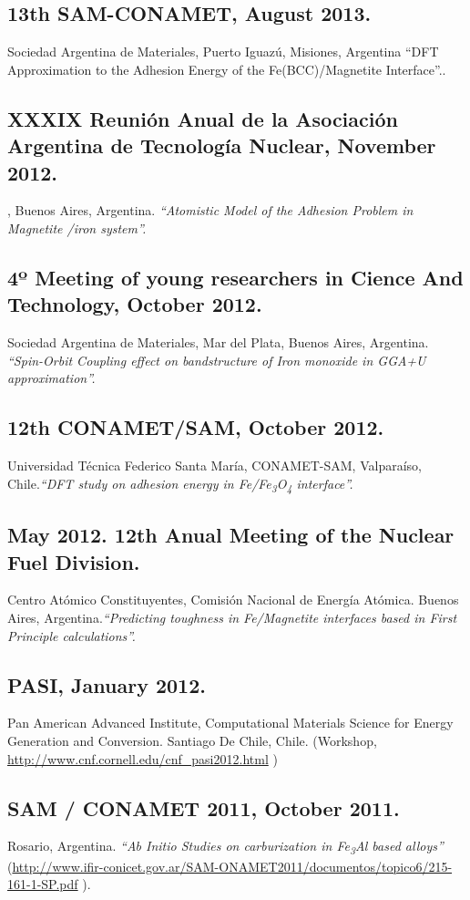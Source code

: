 \subsection{13th SAM-CONAMET, August 2013.} Sociedad Argentina de Materiales, Puerto Iguazú, Misiones, Argentina “DFT Approximation to the Adhesion Energy of the Fe(BCC)/Magnetite Interface”..

\subsection{XXXIX Reunión Anual de la Asociación Argentina de Tecnología Nuclear, November 2012.}, Buenos Aires, Argentina.
\emph{ “Atomistic Model of the Adhesion Problem in Magnetite /iron system”. }

\subsection{4º Meeting of young researchers in Cience And Technology, October 2012.}Sociedad Argentina de Materiales, Mar del Plata, Buenos Aires, Argentina. \emph{  “Spin-Orbit Coupling effect on bandstructure of Iron monoxide in GGA+U approximation”. }

\subsection{12th CONAMET/SAM, October 2012.}  Universidad Técnica Federico Santa María, CONAMET-SAM, Valparaíso, Chile.\emph{“DFT study on adhesion energy in Fe/Fe\textsubscript{3}O\textsubscript{4} interface”.}

\subsection{May 2012. 12th Anual Meeting of the Nuclear Fuel Division.} Centro Atómico Constituyentes, Comisión Nacional de Energía Atómica. Buenos Aires, Argentina.\emph{“Predicting toughness in Fe/Magnetite interfaces based in First Principle calculations”.}

\subsection{PASI, January 2012.} Pan American Advanced Institute, Computational Materials Science for Energy Generation and Conversion. Santiago De Chile, Chile. (Workshop, \url{http://www.cnf.cornell.edu/cnf\_pasi2012.html} ) 

\subsection{SAM / CONAMET 2011, October 2011.}  Rosario, Argentina. \emph{“Ab Initio Studies on carburization in Fe\textsubscript{3}Al based alloys”} (\url{http://www.ifir-conicet.gov.ar/SAM-ONAMET2011/documentos/topico6/215-161-1-SP.pdf} ). 

